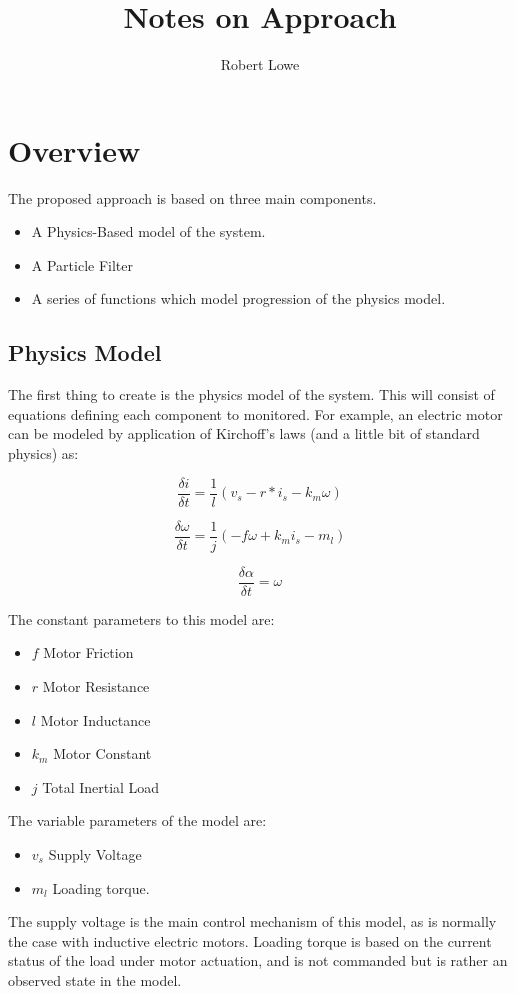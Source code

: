 \documentclass[12pt]{article}
\title{Notes on Approach}
\author{Robert Lowe}
\date{}
\begin{document}
\maketitle

\section{Overview}
The proposed approach is based on three main components.

\begin{itemize}
\item A Physics-Based model of the system.
\item A Particle Filter
\item A series of functions which model progression of the physics
  model.
\end{itemize}

\subsection{Physics Model}
The first thing to create is the physics model of the system.  This
will consist of equations defining each component to monitored.  For
example, an electric motor can be modeled by application of Kirchoff's
laws (and a little bit of standard physics) as:

\[
\dfrac{\delta i}{\delta t} = \dfrac{1}{l} ( v_s - r * i_s - k_m \omega)
\]

\[
\dfrac{\delta \omega}{\delta t} = \dfrac{1}{j} ( -f \omega + k_m i_s
- m_l)
\]

\[
\dfrac{\delta \alpha}{\delta t} = \omega
\]

The constant parameters to this model are:
\begin{itemize}
\item $f$ Motor Friction
\item $r$ Motor Resistance
\item $l$ Motor Inductance
\item $k_m$ Motor Constant
\item $j$ Total Inertial Load
\end{itemize}

The variable parameters of the model are:
\begin{itemize}
\item $v_s$ Supply Voltage
\item $m_l$ Loading torque.
\end{itemize}

The supply voltage is the main control mechanism of this model, as is
normally the case with inductive electric motors.  Loading torque is
based on the current status of the load under motor actuation, and is
not commanded but is rather an observed state in the model.
\end{document}
